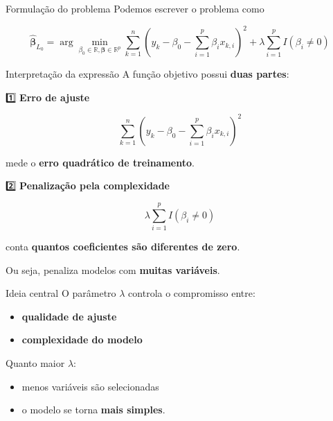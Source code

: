 \documentclass[
  ignorenonframetext,
  aspectratio=169,
]{beamer}
\providecommand{\tightlist}{%
  \setlength{\itemsep}{0pt}\setlength{\parskip}{0pt}}
\begin{document}
\begin{frame}
\begin{block}{Formulação do problema}
\label{formulauxe7uxe3o-do-problema}
Podemos escrever o problema como

\[
\hat{\boldsymbol{\beta}}_{L_0} =
\arg\min_{\beta_0 \in \mathbb{R}, \boldsymbol{\beta} \in \mathbb{R}^p}
\sum_{k=1}^{n}
\left(
y_k - \beta_0 - \sum_{i=1}^{p} \beta_i x_{k,i}
\right)^2
+
\lambda \sum_{i=1}^{p} I(\beta_i \neq 0)
\]
\end{block}
\end{frame}

\begin{frame}
\begin{block}{Interpretação da expressão}
\label{interpretauxe7uxe3o-da-expressuxe3o}
A função objetivo possui \textbf{duas partes}:

1️⃣ \textbf{Erro de ajuste}

\[
\sum_{k=1}^{n}
\left(
y_k - \beta_0 - \sum_{i=1}^{p} \beta_i x_{k,i}
\right)^2
\]

mede o \textbf{erro quadrático de treinamento}.
\end{block}
\end{frame}

\begin{frame}
2️⃣ \textbf{Penalização pela complexidade}

\[
\lambda \sum_{i=1}^{p} I(\beta_i \neq 0)
\]

conta \textbf{quantos coeficientes são diferentes de zero}.

Ou seja, penaliza modelos com \textbf{muitas variáveis}.
\end{frame}

\begin{frame}
\begin{block}{Ideia central}
\label{ideia-central-1}
O parâmetro \(\lambda\) controla o compromisso entre:

\begin{itemize}
\tightlist
\item
  \textbf{qualidade de ajuste}
\item
  \textbf{complexidade do modelo}
\end{itemize}

Quanto maior \(\lambda\):

\begin{itemize}
\tightlist
\item
  menos variáveis são selecionadas
\item
  o modelo se torna \textbf{mais simples}.
\end{itemize}
\end{block}
\end{frame}
\end{document}
